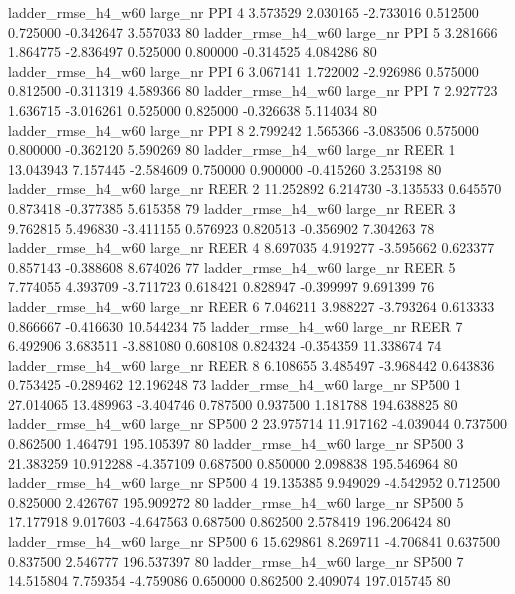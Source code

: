  ladder_rmse_h4_w60   large_nr      PPI                 4  3.573529  2.030165  -2.733016 0.512500 0.725000 -0.342647    3.557033 80
 ladder_rmse_h4_w60   large_nr      PPI                 5  3.281666  1.864775  -2.836497 0.525000 0.800000 -0.314525    4.084286 80
 ladder_rmse_h4_w60   large_nr      PPI                 6  3.067141  1.722002  -2.926986 0.575000 0.812500 -0.311319    4.589366 80
 ladder_rmse_h4_w60   large_nr      PPI                 7  2.927723  1.636715  -3.016261 0.525000 0.825000 -0.326638    5.114034 80
 ladder_rmse_h4_w60   large_nr      PPI                 8  2.799242  1.565366  -3.083506 0.575000 0.800000 -0.362120    5.590269 80
 ladder_rmse_h4_w60   large_nr     REER                 1 13.043943  7.157445  -2.584609 0.750000 0.900000 -0.415260    3.253198 80
 ladder_rmse_h4_w60   large_nr     REER                 2 11.252892  6.214730  -3.135533 0.645570 0.873418 -0.377385    5.615358 79
 ladder_rmse_h4_w60   large_nr     REER                 3  9.762815  5.496830  -3.411155 0.576923 0.820513 -0.356902    7.304263 78
 ladder_rmse_h4_w60   large_nr     REER                 4  8.697035  4.919277  -3.595662 0.623377 0.857143 -0.388608    8.674026 77
 ladder_rmse_h4_w60   large_nr     REER                 5  7.774055  4.393709  -3.711723 0.618421 0.828947 -0.399997    9.691399 76
 ladder_rmse_h4_w60   large_nr     REER                 6  7.046211  3.988227  -3.793264 0.613333 0.866667 -0.416630   10.544234 75
 ladder_rmse_h4_w60   large_nr     REER                 7  6.492906  3.683511  -3.881080 0.608108 0.824324 -0.354359   11.338674 74
 ladder_rmse_h4_w60   large_nr     REER                 8  6.108655  3.485497  -3.968442 0.643836 0.753425 -0.289462   12.196248 73
 ladder_rmse_h4_w60   large_nr    SP500                 1 27.014065 13.489963  -3.404746 0.787500 0.937500  1.181788  194.638825 80
 ladder_rmse_h4_w60   large_nr    SP500                 2 23.975714 11.917162  -4.039044 0.737500 0.862500  1.464791  195.105397 80
 ladder_rmse_h4_w60   large_nr    SP500                 3 21.383259 10.912288  -4.357109 0.687500 0.850000  2.098838  195.546964 80
 ladder_rmse_h4_w60   large_nr    SP500                 4 19.135385  9.949029  -4.542952 0.712500 0.825000  2.426767  195.909272 80
 ladder_rmse_h4_w60   large_nr    SP500                 5 17.177918  9.017603  -4.647563 0.687500 0.862500  2.578419  196.206424 80
 ladder_rmse_h4_w60   large_nr    SP500                 6 15.629861  8.269711  -4.706841 0.637500 0.837500  2.546777  196.537397 80
 ladder_rmse_h4_w60   large_nr    SP500                 7 14.515804  7.759354  -4.759086 0.650000 0.862500  2.409074  197.015745 80
